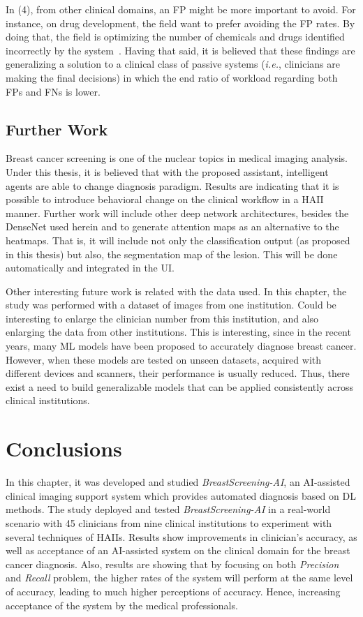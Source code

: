 In (4), from other clinical domains, an \ac{FP} might be more important to avoid.
For instance, on drug development, the field want to prefer avoiding the \ac{FP} rates.
By doing that, the field is optimizing the number of chemicals and drugs identified incorrectly by the system~\cite{raja2017machine}.
Having that said, it is believed that these findings are generalizing a solution to a clinical class of passive systems ({\it i.e.}, clinicians are making the final decisions) in which the end ratio of workload regarding both \acp{FP} and \acp{FN} is lower.

\subsection{Further Work}
\label{sec:sec006007004}

Breast cancer screening is one of the nuclear topics in medical imaging analysis.
Under this thesis, it is believed that with the proposed assistant, intelligent agents are able to change diagnosis paradigm.
Results are indicating that it is possible to introduce behavioral change on the clinical workflow in a \ac{HAII} manner.
Further work will include other deep network architectures, besides the DenseNet used herein and to generate attention maps as an alternative to the heatmaps.
That is, it will include not only the classification output (as proposed in this thesis) but also, the segmentation map of the lesion.
This will be done automatically and integrated in the \ac{UI}.

Other interesting future work is related with the data used. 
In this chapter, the study was performed with a dataset of images from one institution.
Could be interesting to enlarge the clinician number from this institution, and also enlarging the data from other institutions.
This is interesting, since in the recent years, many \ac{ML} models have been proposed to accurately diagnose breast cancer.
However, when these models are tested on unseen datasets, acquired with different devices and scanners, their performance is usually reduced.
Thus, there exist a need to build generalizable models that can be applied consistently across clinical institutions.

\section{Conclusions}
\label{sec:sec006008}

In this chapter, it was developed and studied {\it BreastScreening-AI}, an \ac{AI}-assisted clinical imaging support system which provides automated diagnosis based on \ac{DL} methods.
The study deployed and tested {\it BreastScreening-AI} in a real-world scenario with 45 clinicians from nine clinical institutions to experiment with several techniques of \acp{HAII}.
Results show improvements in clinician’s accuracy, as well as acceptance of an \ac{AI}-assisted system on the clinical domain for the breast cancer diagnosis.
Also, results are showing that by focusing on both {\it Precision} and {\it Recall} problem, the higher rates of the system will perform at the same level of accuracy, leading to much higher perceptions of accuracy.
Hence, increasing acceptance of the system by the medical professionals.

